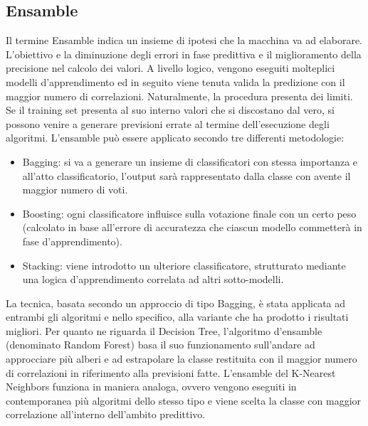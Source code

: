 \documentclass[10pt,a4paper]{article}
\begin{document}
\subsection{Ensamble}
 Il termine Ensamble indica un insieme di ipotesi che la macchina va ad elaborare.\hfill \break
 L'obiettivo e la diminuzione degli errori in fase predittiva e il miglioramento della precisione nel calcolo dei valori.
 A livello logico, vengono eseguiti molteplici modelli d'apprendimento ed in seguito viene tenuta valida la predizione con il maggior numero di correlazioni.
 Naturalmente, la procedura presenta dei limiti.\hfill \break
 Se il training set presenta al suo interno valori che si discostano dal vero, si possono venire a generare previsioni errate al termine dell'esecuzione degli algoritmi.\hfill \break
 L'ensamble può essere applicato secondo tre differenti metodologie:
 
\begin{itemize}
    \item Bagging: si va a generare un insieme di classificatori con stessa importanza e all'atto classificatorio, l'output sarà rappresentato dalla classe con avente il maggior numero di voti.
\end{itemize}

\begin{itemize}
    \item Boosting: ogni classificatore influisce sulla votazione finale con un certo peso (calcolato in base all'errore di accuratezza che ciascun modello commetterà in fase d'apprendimento).
\end{itemize}


\begin{itemize}
    \item Stacking: viene introdotto un ulteriore classificatore, strutturato mediante una logica d'apprendimento correlata ad altri sotto-modelli.
\end{itemize}
 
\hfill \break
La tecnica, basata secondo un approccio di tipo Bagging, è stata applicata ad entrambi gli algoritmi e nello specifico, alla variante che ha prodotto i risultati migliori.\hfill \break
Per quanto ne riguarda il Decision Tree, l'algoritmo d'ensamble (denominato Random Forest) basa il suo funzionamento sull'andare ad approcciare più alberi e ad estrapolare la classe restituita con il maggior numero di correlazioni in riferimento alla previsioni fatte.\hfill \break
L'ensamble del K-Nearest Neighbors funziona in maniera analoga, ovvero vengono eseguiti in contemporanea più algoritmi dello stesso tipo e viene scelta la classe con maggior correlazione all'interno dell'ambito predittivo.
\end{document}
